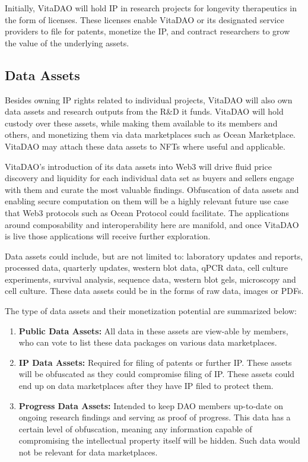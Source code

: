 \documentclass[12pt,letterpaper]{article}
\begin{document}
Initially, VitaDAO will hold IP in research projects for longevity therapeutics in the form of licenses. These licenses enable VitaDAO or its designated service providers to file for patents, monetize the IP, and contract researchers to grow the value of the underlying assets. 

\subsection{Data Assets}
Besides owning IP rights related to individual projects, VitaDAO will also own data assets and research outputs from the R\&D it funds. VitaDAO will hold custody over these assets, while making them available to its members and others, and monetizing them via data marketplaces such as Ocean Marketplace. VitaDAO may attach these data assets to NFTs where useful and applicable.
 
VitaDAO’s introduction of its data assets into Web3 will drive fluid price discovery and liquidity for each individual data set as buyers and sellers engage with them and curate the most valuable findings. Obfuscation of data assets and enabling secure computation on them will be a highly relevant future use case that Web3 protocols such as Ocean Protocol could facilitate. The applications around composability and interoperability here are manifold, and once VitaDAO is live those applications will receive further exploration. 

Data assets could include, but are not limited to: laboratory updates and reports, processed data, quarterly updates, western blot data, qPCR data, cell culture experiments, survival analysis, sequence data, western blot gels, microscopy and cell culture. These data assets could be in the forms of raw data, images or PDFs. 

The type of data assets and their monetization potential are summarized below:

\begin{enumerate}
\item \textbf{Public Data Assets:} All data in these assets are view-able by members, who can vote to list these data packages on various data marketplaces.
\item \textbf{IP Data Assets:} Required for filing of patents or further IP. These assets will be obfuscated as they could compromise filing of IP. These assets could end up on data marketplaces after they have IP filed to protect them.
\item \textbf{Progress Data Assets:} Intended to keep DAO members up-to-date on ongoing research findings and serving as proof of progress. This data has a certain level of obfuscation, meaning any information capable of compromising the intellectual property itself will be hidden. Such data would not be relevant for data marketplaces.
\end{enumerate}
\end{document}
